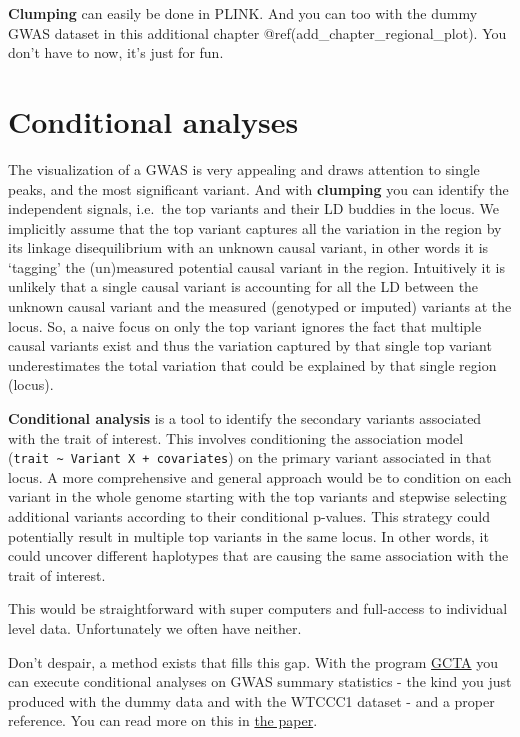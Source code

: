 \documentclass[
]{book}
\begin{document}
\textbf{Clumping} can easily be done in PLINK. And you can too with the dummy GWAS dataset in this additional chapter @ref(add\_chapter\_regional\_plot). You don't have to now, it's just for fun.

\hypertarget{conditional-analyses}{%
\section{Conditional analyses}\label{conditional-analyses}}

The visualization of a GWAS is very appealing and draws attention to single peaks, and the most significant variant. And with \textbf{clumping} you can identify the independent signals, i.e.~the top variants and their LD buddies in the locus. We implicitly assume that the top variant captures all the variation in the region by its linkage disequilibrium with an unknown causal variant, in other words it is `tagging' the (un)measured potential causal variant in the region. Intuitively it is unlikely that a single causal variant is accounting for all the LD between the unknown causal variant and the measured (genotyped or imputed) variants at the locus. So, a naive focus on only the top variant ignores the fact that multiple causal variants exist and thus the variation captured by that single top variant underestimates the total variation that could be explained by that single region (locus).

\textbf{Conditional analysis} is a tool to identify the secondary variants associated with the trait of interest. This involves conditioning the association model (\texttt{trait\ \textasciitilde{}\ Variant\ X\ +\ covariates}) on the primary variant associated in that locus. A more comprehensive and general approach would be to condition on each variant in the whole genome starting with the top variants and stepwise selecting additional variants according to their conditional p-values. This strategy could potentially result in multiple top variants in the same locus. In other words, it could uncover different haplotypes that are causing the same association with the trait of interest.

This would be straightforward with super computers and full-access to individual level data. Unfortunately we often have neither.

Don't despair, a method exists that fills this gap. With the program \href{http://cnsgenomics.com/software/gcta/\#Overview}{GCTA} you can execute conditional analyses on GWAS summary statistics - the kind you just produced with the dummy data and with the WTCCC1 dataset - and a proper reference. You can read more on this in \href{https://www.nature.com/articles/ng.2213}{the paper}.
\end{document}

